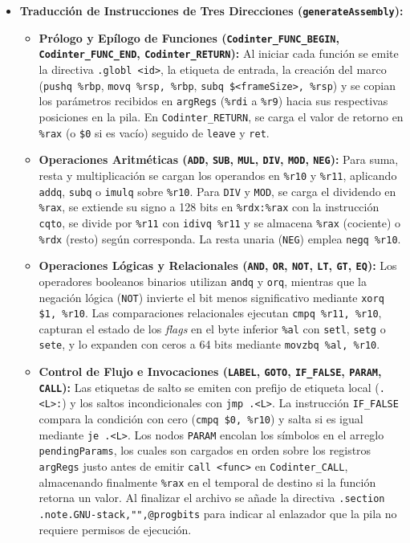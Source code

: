 \documentclass[12pt, a4paper]{article}
\begin{document}
\begin{itemize}
    \item \textbf{Traducción de Instrucciones de Tres Direcciones (\texttt{generateAssembly}):}
    \begin{itemize}
        \item \textbf{Prólogo y Epílogo de Funciones (\texttt{Codinter\_FUNC\_BEGIN}, \texttt{Codinter\_FUNC\_END}, \texttt{Codinter\_RETURN}):} Al iniciar cada función se emite la directiva \texttt{.globl <id>}, la etiqueta de entrada, la creación del marco (\texttt{pushq \%rbp}, \texttt{movq \%rsp, \%rbp}, \texttt{subq \$<frameSize>, \%rsp}) y se copian los parámetros recibidos en \texttt{argRegs} (\texttt{\%rdi} a \texttt{\%r9}) hacia sus respectivas posiciones en la pila. En \texttt{Codinter\_RETURN}, se carga el valor de retorno en \texttt{\%rax} (o \texttt{\$0} si es vacío) seguido de \texttt{leave} y \texttt{ret}.
        \item \textbf{Operaciones Aritméticas (\texttt{ADD}, \texttt{SUB}, \texttt{MUL}, \texttt{DIV}, \texttt{MOD}, \texttt{NEG}):} Para suma, resta y multiplicación se cargan los operandos en \texttt{\%r10} y \texttt{\%r11}, aplicando \texttt{addq}, \texttt{subq} o \texttt{imulq} sobre \texttt{\%r10}. Para \texttt{DIV} y \texttt{MOD}, se carga el dividendo en \texttt{\%rax}, se extiende su signo a 128 bits en \texttt{\%rdx:\%rax} con la instrucción \texttt{cqto}, se divide por \texttt{\%r11} con \texttt{idivq \%r11} y se almacena \texttt{\%rax} (cociente) o \texttt{\%rdx} (resto) según corresponda. La resta unaria (\texttt{NEG}) emplea \texttt{negq \%r10}.
        \item \textbf{Operaciones Lógicas y Relacionales (\texttt{AND}, \texttt{OR}, \texttt{NOT}, \texttt{LT}, \texttt{GT}, \texttt{EQ}):} Los operadores booleanos binarios utilizan \texttt{andq} y \texttt{orq}, mientras que la negación lógica (\texttt{NOT}) invierte el bit menos significativo mediante \texttt{xorq \$1, \%r10}. Las comparaciones relacionales ejecutan \texttt{cmpq \%r11, \%r10}, capturan el estado de los \textit{flags} en el byte inferior \texttt{\%al} con \texttt{setl}, \texttt{setg} o \texttt{sete}, y lo expanden con ceros a 64 bits mediante \texttt{movzbq \%al, \%r10}.
        \item \textbf{Control de Flujo e Invocaciones (\texttt{LABEL}, \texttt{GOTO}, \texttt{IF\_FALSE}, \texttt{PARAM}, \texttt{CALL}):} Las etiquetas de salto se emiten con prefijo de etiqueta local (\texttt{.<L>:}) y los saltos incondicionales con \texttt{jmp .<L>}. La instrucción \texttt{IF\_FALSE} compara la condición con cero (\texttt{cmpq \$0, \%r10}) y salta si es igual mediante \texttt{je .<L>}. Los nodos \texttt{PARAM} encolan los símbolos en el arreglo \texttt{pendingParams}, los cuales son cargados en orden sobre los registros \texttt{argRegs} justo antes de emitir \texttt{call <func>} en \texttt{Codinter\_CALL}, almacenando finalmente \texttt{\%rax} en el temporal de destino si la función retorna un valor. Al finalizar el archivo se añade la directiva \texttt{.section .note.GNU-stack,"",@progbits} para indicar al enlazador que la pila no requiere permisos de ejecución.
    \end{itemize}
\end{itemize}
\end{document}
